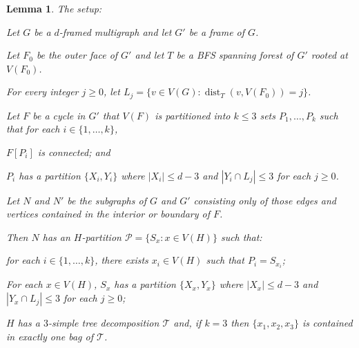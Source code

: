 \documentclass{patmorin}
\theoremstyle{plain}
\newtheorem{lem}[thm]{Lemma}
\theoremstyle{definition}
\newcommand{\note}[2]{\noindent{\color{red}[#1:~#2]}}
\DeclareMathOperator{\dist}{dist}
\newcommand{\PP}{\mathcal{P}}
\renewcommand{\ge}{\geqslant}
\renewcommand{\le}{\leqslant}
\begin{document}
\begin{lem}
	\label{induction} The setup:
	\begin{compactenum}
		\item Let $G$ be a $d$-framed multigraph and let $G'$ be a frame of $G$.
		\item Let $F_0$ be the outer face of $G'$ and let $T$ be a BFS spanning forest of $G'$ rooted at $V(F_0)$.
		\item For every integer $j\ge 0$, let $L_j=\{v\in V(G):\dist_T(v,V(F_0))=j\}$.
		\item Let $F$ be a cycle in $G'$ that $V(F)$ is partitioned into $k\le 3$ sets $P_1,\ldots,P_k$ such that for each $i\in\{1,\ldots,k\}$,
		\begin{compactenum}
			\item $F[P_i]$ is connected; and
			\item $P_i$ has a partition $\{X_i,Y_i\}$ where $|X_i|\le d-3$ and $|Y_i\cap L_j| \le 3$ for each $j\ge 0$.
		\end{compactenum}
		\item Let $N$ and $N'$ be the subgraphs of $G$ and $G'$ consisting only of those edges and vertices contained in the interior or boundary of $F$.
	\end{compactenum}
	Then $N$ has an $H$-partition $\PP=\{S_x: x\in V(H)\}$ such that:
	\begin{compactenum}[(i)]
		\item for each $i\in\{1,\ldots,k\}$, there exists $x_i\in V(H)$ such that $P_i=S_{x_i}$;
		\item For each $x\in V(H)$, $S_x$ has a partition $\{X_x,Y_x\}$ where $|X_x|\le d-3$ and $|Y_x\cap L_j|\le 3$ for each $j\ge 0$;
		\item $H$ has a $3$-simple tree decomposition $\mathcal{T}$ and, if $k=3$ then $\{x_1,x_2,x_3\}$ is contained in exactly one bag of $\mathcal{T}$.
	\end{compactenum}

\end{lem}
\end{document}
